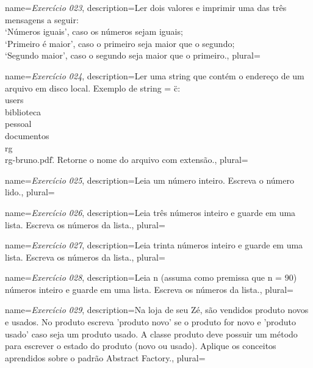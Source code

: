 {
	name={\textit{Exercício 023}},
	description={Ler dois valores e imprimir uma das três mensagens a seguir:\\
		‘Números iguais’, caso os números sejam iguais;\\
		‘Primeiro é maior’, caso o primeiro seja maior que o segundo;\\
		‘Segundo maior’, caso o segundo seja maior que o primeiro.},
	plural={}
}


{
	name={\textit{Exercício 024}},
	description={Ler uma string que contém o endereço de um arquivo em disco local. Exemplo de string = \"c:\\users\\biblioteca\\pessoal\\documentos\\rg\\rg-bruno.pdf\". Retorne o nome do arquivo com extensão.},
	plural={}
}


{
	name={\textit{Exercício 025}},
	description={Leia um número inteiro. Escreva o número lido.},
	plural={}
}

{
	name={\textit{Exercício 026}},
	description={Leia três números inteiro e guarde em uma lista. Escreva os números da lista.},
	plural={}
}


{
	name={\textit{Exercício 027}},
	description={Leia trinta números inteiro e guarde em uma lista. Escreva os números da lista.},
	plural={}
}


{
	name={\textit{Exercício 028}},
	description={Leia n (assuma como premissa que n = 90) números inteiro e guarde em uma lista. Escreva os números da lista.},
	plural={}
}

{
	name={\textit{Exercício 029}},
	description={Na loja de seu Zé, são vendidos produto novos e usados. No produto escreva 'produto novo' se o produto for novo e 'produto usado' caso seja um produto usado. A classe produto deve possuir um método para escrever o estado do produto (novo ou usado). Aplique os conceitos aprendidos sobre o padrão Abstract Factory.},
	plural={}
}

